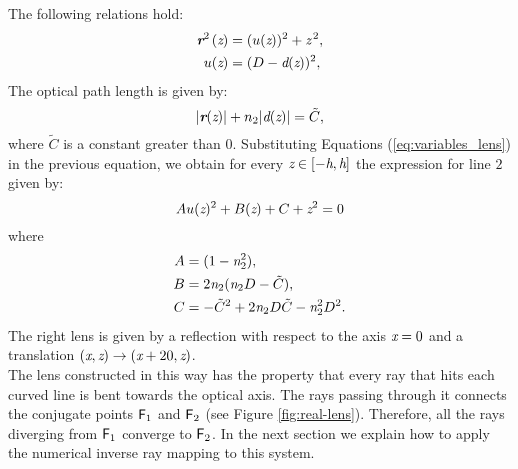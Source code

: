 The following relations hold:
\begin{equation}\label{eq:variables_lens}
\begin{aligned}
\textit{\textbf{r}}^{2\,}(\textit{z}) &= (u(\textit{z}))^2+\textit{z}^{\,2},\\
u(\textit{z}) &= (D-\textit{d}(\textit{z}))^2, 
\end{aligned}
\end{equation}
The optical path length is given by:
\begin{equation}\label{eq:path_length}
|\textit{\textbf{r}}(\textit{z})|+n_2|\textit{d}(\textit{z})|=\tilde{C},
\end{equation}  
where $\tilde{C}$ is a constant greater than $0$. Substituting Equations (\ref{eq:variables_lens}) in the previous equation,
we obtain for every $\textit{z}\in[-\textit{h}, \textit{h}]$ the expression for line $2$ given by:
\begin{equation}
Au(\textit{z})^2+B(\textit{z})+C+\textit{z}^2 = 0
\end{equation}
where 
\begin{equation}
\begin{aligned}
A & = (1-\textit{n}_2^2), \\
B & = 2\textit{n}_2(\textit{n}_2 D-\tilde{C}), \\
C & = -\tilde{C}^2+2\textit{n}_2 D\tilde{C}-\textit{n}_2^2D^2. \\
\end{aligned}
\end{equation}
The right lens is given by a reflection with respect to the axis $\textit{x}=0$ and a translation $(\textit{x}, \textit{z})\rightarrow (\textit{x}+20, \textit{z})$.
\\ \indent The lens constructed in this way has the property that every ray that hits each curved line is bent towards the optical axis. The rays passing through it connects the conjugate points $\textsf{F}_1 $ and $\textsf{F}_2$ (see Figure \ref{fig:real-lens}). Therefore, all the rays diverging from $\textsf{F}_1$ converge to $\textsf{F}_2$. In the next section we explain how to apply the numerical inverse ray mapping to this system.
